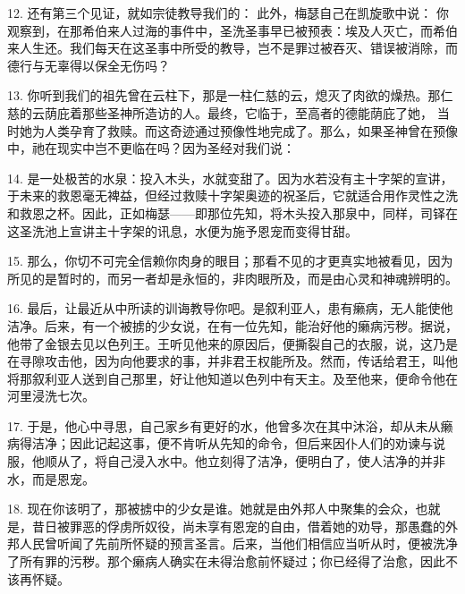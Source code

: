 12. 还有第三个见证，就如宗徒教导我们的：  此外，梅瑟自己在凯旋歌中说：  你观察到，在那希伯来人过海的事件中，圣洗圣事早已被预表：埃及人灭亡，而希伯来人生还。我们每天在这圣事中所受的教导，岂不是罪过被吞灭、错误被消除，而德行与无辜得以保全无伤吗？\par

13. 你听到我们的祖先曾在云柱下，那是一柱仁慈的云，熄灭了肉欲的燥热。那仁慈的云荫庇着那些圣神所造访的人。最终，它临于，至高者的德能荫庇了她， 当时她为人类孕育了救赎。而这奇迹通过预像性地完成了。那么，如果圣神曾在预像中，祂在现实中岂不更临在吗？因为圣经对我们说： \par

14. 是一处极苦的水泉：投入木头，水就变甜了。因为水若没有主十字架的宣讲，于未来的救恩毫无裨益，但经过救赎十字架奥迹的祝圣后，它就适合用作灵性之洗和救恩之杯。因此，正如梅瑟——即那位先知，将木头投入那泉中，同样，司铎在这圣洗池上宣讲主十字架的讯息，水便为施予恩宠而变得甘甜。\par

15. 那么，你切不可完全信赖你肉身的眼目；那看不见的才更真实地被看见，因为所见的是暂时的，而另一者却是永恒的，非肉眼所及，而是由心灵和神魂辨明的。\par

16. 最后，让最近从中所读的训诲教导你吧。是叙利亚人，患有癞病，无人能使他洁净。后来，有一个被掳的少女说，在有一位先知，能治好他的癞病污秽。据说，他带了金银去见以色列王。王听见他来的原因后，便撕裂自己的衣服，说，这乃是在寻隙攻击他，因为向他要求的事，并非君王权能所及。然而，传话给君王，叫他将那叙利亚人送到自己那里，好让他知道以色列中有天主。及至他来，便命令他在河里浸洗七次。\par

17. 于是，他心中寻思，自己家乡有更好的水，他曾多次在其中沐浴，却从未从癞病得洁净；因此记起这事，便不肯听从先知的命令，但后来因仆人们的劝谏与说服，他顺从了，将自己浸入水中。他立刻得了洁净，便明白了，使人洁净的并非水，而是恩宠。\par

18. 现在你该明了，那被掳中的少女是谁。她就是由外邦人中聚集的会众，也就是，昔日被罪恶的俘虏所奴役，尚未享有恩宠的自由，借着她的劝导，那愚蠢的外邦人民曾听闻了先前所怀疑的预言圣言。后来，当他们相信应当听从时，便被洗净了所有罪的污秽。那个癞病人确实在未得治愈前怀疑过；你已经得了治愈，因此不该再怀疑。\par

